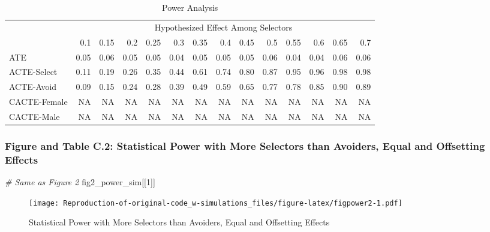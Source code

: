 \documentclass[
]{article}
\newenvironment{Shaded}{\begin{snugshade}}{\end{snugshade}}
\newcommand{\CommentTok}[1]{\textcolor[rgb]{0.56,0.35,0.01}{\textit{#1}}}
\newcommand{\DecValTok}[1]{\textcolor[rgb]{0.00,0.00,0.81}{#1}}
\newcommand{\NormalTok}[1]{#1}
\begin{document}
\begin{table}[!h]

\caption{\label{tab:figpower1}Power Analysis}
\centering
\begin{tabular}[t]{lrrrrrrrrrrrrr}
\toprule
\multicolumn{1}{c}{} & \multicolumn{13}{c}{Hypothesized Effect Among Selectors} \\
\cmidrule(l{3pt}r{3pt}){2-14}
  & 0.1 & 0.15 & 0.2 & 0.25 & 0.3 & 0.35 & 0.4 & 0.45 & 0.5 & 0.55 & 0.6 & 0.65 & 0.7\\
\midrule
ATE & 0.05 & 0.06 & 0.05 & 0.05 & 0.04 & 0.05 & 0.05 & 0.05 & 0.06 & 0.04 & 0.04 & 0.06 & 0.06\\
ACTE-Select & 0.11 & 0.19 & 0.26 & 0.35 & 0.44 & 0.61 & 0.74 & 0.80 & 0.87 & 0.95 & 0.96 & 0.98 & 0.98\\
ACTE-Avoid & 0.09 & 0.15 & 0.24 & 0.28 & 0.39 & 0.49 & 0.59 & 0.65 & 0.77 & 0.78 & 0.85 & 0.90 & 0.89\\
CACTE-Female & NA & NA & NA & NA & NA & NA & NA & NA & NA & NA & NA & NA & NA\\
CACTE-Male & NA & NA & NA & NA & NA & NA & NA & NA & NA & NA & NA & NA & NA\\
\bottomrule
\end{tabular}
\end{table}

\hypertarget{figure-and-table-c.2-statistical-power-with-more-selectors-than-avoiders-equal-and-offsetting-effects}{%
\subsubsection{Figure and Table C.2: Statistical Power with More
Selectors than Avoiders, Equal and Offsetting
Effects}\label{figure-and-table-c.2-statistical-power-with-more-selectors-than-avoiders-equal-and-offsetting-effects}}

\begin{Shaded}
\begin{Highlighting}[]
\CommentTok{\# Same as Figure 2}
\NormalTok{fig2\_power\_sim[[}\DecValTok{1}\NormalTok{]]}
\end{Highlighting}
\end{Shaded}

\begin{figure}
\centering
\texttt{[image: Reproduction-of-original-code\_w-simulations\_files/figure-latex/figpower2-1.pdf]}
\caption{Statistical Power with More Selectors than Avoiders, Equal and
Offsetting Effects}
\end{figure}
\end{document}
